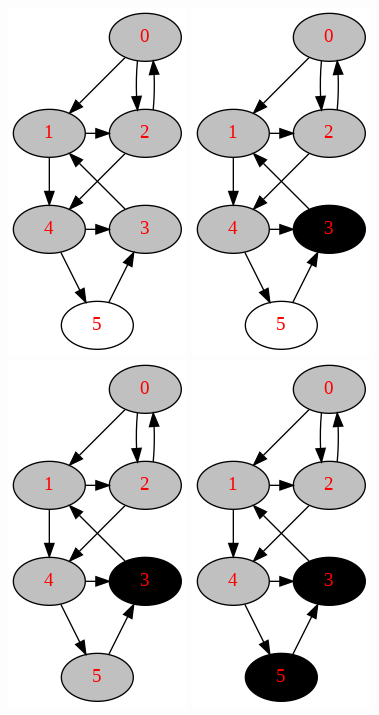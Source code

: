 \documentclass[../main.tex]{subfiles}
\begin{document}
\begin{figure}[!ht]
     \includegraphics[width=0.2\columnwidth]{fig/depth_first_graph_search_process4.png}
    \includegraphics[width=0.2\columnwidth]{fig/depth_first_graph_search_process5.png}
    \includegraphics[width=0.2\columnwidth]{fig/depth_first_graph_search_process6.png}
    \includegraphics[width=0.2\columnwidth]{fig/depth_first_graph_search_process7.png}
    

\end{figure}
\end{document}
